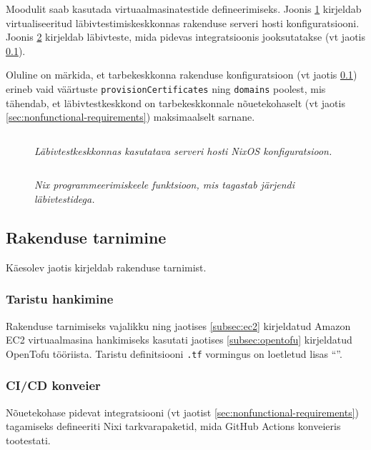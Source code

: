Moodulit saab kasutada virtuaalmasinatestide defineerimiseks. Joonis \ref{fig:test-vm-server} kirjeldab virtualiseeritud läbivtestimiskeskkonnas rakenduse serveri hosti konfiguratsiooni. Joonis \ref{fig:vm-tests} kirjeldab läbivteste, mida pidevas integratsioonis jooksutatakse (vt jaotis \ref{subsec:cicd}).

Oluline on märkida, et tarbekeskkonna rakenduse konfiguratsioon (vt jaotis \ref{subsec:cicd}) erineb vaid väärtuste \texttt{provisionCertificates} ning \texttt{domains} poolest, mis tähendab, et läbivtestkeskkond on tarbekeskkonnale nõuetekohaselt (vt jaotis \ref{sec:nonfunctional-requirements}) maksimaalselt sarnane.

\begin{figure}
\inputminted[breaklines]{nix}{chapters/data/test-vm-server.nix}
\caption{\emph{Läbivtestkeskkonnas kasutatava serveri hosti NixOS konfiguratsioon.}}\label{fig:test-vm-server}
\end{figure}

\begin{figure}
\inputminted[breaklines]{nix}{chapters/data/vm-tests.nix}
\caption{\emph{Nix programmeerimiskeele funktsioon, mis tagastab järjendi läbivtestidega.}}\label{fig:vm-tests}
\end{figure}

\subsection{Rakenduse tarnimine}\label{subsec:cicd}

Käesolev jaotis kirjeldab rakenduse tarnimist.

\subsubsection{Taristu hankimine}

Rakenduse tarnimiseks vajalikku ning jaotises \ref{subsec:ec2} kirjeldatud Amazon EC2 virtuaalmasina hankimiseks kasutati jaotises \ref{subsec:opentofu} kirjeldatud OpenTofu tööriista. Taristu definitsiooni \texttt{.tf} vormingus on loetletud lisas ``''.

\subsubsection{CI/CD konveier}

Nõuetekohase pidevat integratsiooni (vt jaotist \ref{sec:nonfunctional-requirements}) tagamiseks defineeriti Nixi tarkvarapaketid, mida GitHub Actions konveieris tootestati.

